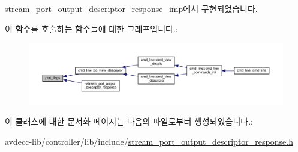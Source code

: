 \hyperlink{classavdecc__lib_1_1stream__port__output__descriptor__response__imp_ae5cbe71db539f040ce51a399c2ba66c5}{stream\+\_\+port\+\_\+output\+\_\+descriptor\+\_\+response\+\_\+imp}에서 구현되었습니다.



이 함수를 호출하는 함수들에 대한 그래프입니다.\+:
\nopagebreak
\begin{figure}[H]
\begin{center}
\leavevmode
\includegraphics[width=350pt]{classavdecc__lib_1_1stream__port__output__descriptor__response_a66bad2f1317cba04f0ea271f7181b58f_icgraph}
\end{center}
\end{figure}




이 클래스에 대한 문서화 페이지는 다음의 파일로부터 생성되었습니다.\+:\begin{DoxyCompactItemize}
\item 
avdecc-\/lib/controller/lib/include/\hyperlink{stream__port__output__descriptor__response_8h}{stream\+\_\+port\+\_\+output\+\_\+descriptor\+\_\+response.\+h}\end{DoxyCompactItemize}
